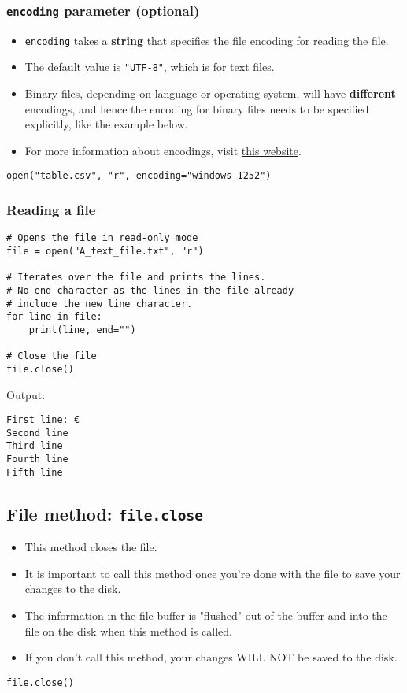 \documentclass[11pt]{article}
\begin{document}
\subsubsection{\texttt{encoding} parameter (optional)}
\label{sec:org61c18bf}
\begin{itemize}
\item \texttt{encoding} takes a \textbf{string} that specifies the file encoding for reading the file.
\item The default value is \texttt{"UTF-8"}, which is for text files.
\item Binary files, depending on language or operating system, will have \textbf{different} encodings, and hence the encoding for binary files needs to be specified explicitly, like the example below.
\item For more information about encodings, visit \href{http://getpython3.com/diveintopython3/strings.html\#boring-stuff}{this website}.
\end{itemize}
\begin{verbatim}
open("table.csv", "r", encoding="windows-1252")
\end{verbatim}
\subsubsection{Reading a file}
\label{sec:orgc10f6ba}
\begin{verbatim}
# Opens the file in read-only mode
file = open("A_text_file.txt", "r")

# Iterates over the file and prints the lines.
# No end character as the lines in the file already
# include the new line character.
for line in file:
    print(line, end="")

# Close the file
file.close()
\end{verbatim}

 \noindent Output:

\label{org75bbd95}
\begin{verbatim}
First line: €
Second line
Third line
Fourth line
Fifth line
\end{verbatim}


 \newpage
\subsection{File method: \texttt{file.close}}
\label{sec:org0184490}
\begin{itemize}
\item This method closes the file.
\item It is important to call this method once you're done with the file to save your changes to the disk.
\item The information in the file buffer is "flushed" out of the buffer and into the file on the disk when this method is called.
\item If you don't call this method, your changes WILL NOT be saved to the disk.
\end{itemize}
\begin{verbatim}
file.close()
\end{verbatim}
\end{document}
